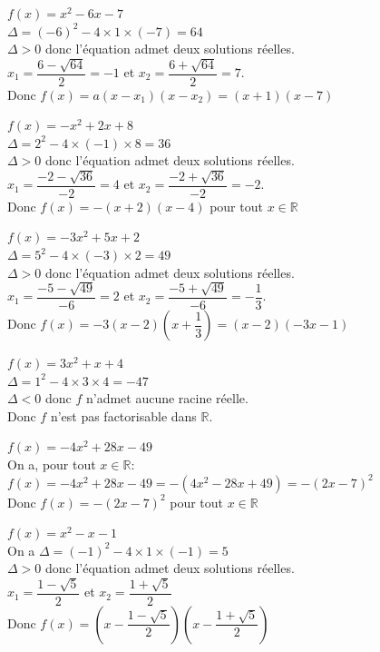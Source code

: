 \documentclass[12pt,a4paper]{book}
\begin{document}
\begin{enumMet}
    \item $f(x)=x^{2}-6 x-7$\\
    $\Delta=(-6)^{2}-4 \times 1 \times(-7)=64$\\
    $\Delta>0$ donc l'équation admet deux solutions réelles.\\ $x_{1}=\dfrac{6-\sqrt{64}}{2}=-1$ et $x_{2}=\dfrac{6+\sqrt{64}}{2}=7$.\\ 
    Donc $f(x)=a(x-x_1)(x-x_2)=(x+1)(x-7)$
    \item $f(x)=-x^{2}+2 x+8$\\
    $\Delta=2^{2}-4 \times(-1) \times 8=36$ \\
    $\Delta>0$ donc l'équation admet deux solutions réelles.\\
    $x_{1}=\dfrac{-2-\sqrt{36}}{-2}=4$ et $x_{2}=\dfrac{-2+\sqrt{36}}{-2}=-2$. \\
    Donc $f(x)=-(x+2)(x-4)$ pour tout $x \in \mathbb{R}$
    \item $f(x)=-3 x^{2}+5 x+2$\\
    $\Delta=5^{2}-4 \times(-3) \times 2=49$ \\
    $\Delta>0$ donc l'équation admet deux solutions réelles.\\
    $x_{1}=\dfrac{-5-\sqrt{49}}{-6}=2 $ et $x_{2}=\dfrac{-5+\sqrt{49}}{-6}=-\dfrac{1}{3}$.\\
    Donc $f(x)=-3(x-2)\left(x+\dfrac{1}{3}\right)=(x-2)(-3 x-1)$ 
    \item $f(x)=3 x^{2}+x+4$\\
    $\Delta=1^{2}-4 \times 3 \times 4=-47$\\
    $\Delta<0$ donc $f$ n'admet aucune racine réelle.\\
    Donc $f$ n'est pas factorisable dans $\mathbb{R}$.
    \item $f(x)=-4 x^{2}+28 x-49$\\
    On a, pour tout $x \in \mathbb{R}$: \\
    $f(x)=-4 x^{2}+28 x-49=-\left(4 x^{2}-28 x+49\right)=-(2 x-7)^{2}$\\
    Donc $f(x)=-(2 x-7)^{2}$ pour tout $x \in \mathbb{R}$
    \item $f(x)=x^{2}-x-1$\\
    On a $\Delta=(-1)^{2}-4 \times 1 \times(-1)=5$\\
    $\Delta>0$ donc l'équation admet deux solutions réelles.\\
    $x_{1}=\dfrac{1-\sqrt{5}}{2}$ et $x_{2}=\dfrac{1+\sqrt{5}}{2}$\\
    Donc $f(x)=\left(x-\dfrac{1-\sqrt{5}}{2}\right)\left(x-\dfrac{1+\sqrt{5}}{2}\right)$
\end{enumMet}
\end{document}
